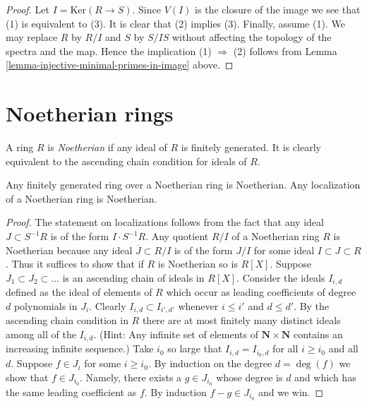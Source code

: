 \begin{proof}
Let $I = \text{Ker}(R \to S)$. Since $V(I)$ is the closure of the
image we see that (1) is equivalent to (3). It is clear that
(2) implies (3). Finally, assume (1). We may replace
$R$ by $R/I$ and $S$ by $S/IS$ without affecting the topology
of the spectra and the map. Hence the implication (1) $\Rightarrow$ (2)
follows from Lemma \ref{lemma-injective-minimal-primes-in-image} above.
\end{proof}








\section{Noetherian rings}
\label{section-Noetherian}

\noindent
A ring $R$ is {\it Noetherian} if any ideal of $R$ is
finitely generated. It is clearly equivalent to the
ascending chain condition for ideals of $R$.

\begin{lemma}
\label{lemma-Noetherian-permanence}
Any finitely generated ring over a Noetherian ring
is Noetherian. Any localization of a Noetherian ring
is Noetherian.
\end{lemma}

\begin{proof}
The statement on localizations follows from the fact
that any ideal $J \subset S^{-1}R$ is of the form
$I \cdot S^{-1}R$. Any quotient $R/I$ of a Noetherian
ring $R$ is Noetherian because any ideal $\overline{J} \subset R/I$
is of the form $J/I$ for some ideal $I \subset J \subset R$.
Thus it suffices to show that if $R$ is Noetherian so
is $R[X]$. Suppose $J_1 \subset J_2 \subset \ldots$ is an
ascending chain of ideals in $R[X]$. Consider the ideals $I_{i, d}$
defined as the ideal of elements of $R$ which occur as leading
coefficients of degree $d$ polynomials in $J_i$.
Clearly $I_{i, d} \subset I_{i', d'}$ whenever
$i \leq i'$ and $d \leq d'$. By the ascending chain condition
in $R$ there are at most finitely many distinct ideals among all of
the $I_{i, d}$.
(Hint: Any infinite set of elements of
$\mathbf{N} \times \mathbf{N}$ contains an increasing
infinite sequence.)
Take $i_0$ so large that $I_{i, d} = I_{i_0, d}$
for all $i \geq i_0$ and all $d$. Suppose $f \in J_i$ for some $i \geq i_0$.
By induction on the degree $d = \deg(f)$ we show that $f \in J_{i_0}$.
Namely, there exists a $g\in J_{i_0}$ whose degree is $d$ and which
has the same leading coefficient as $f$. By induction
$f - g \in J_{i_0}$ and we win.
\end{proof}

